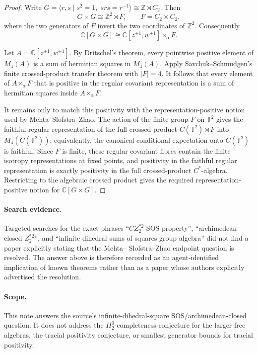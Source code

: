 \documentclass[11pt]{article}
\newcommand{\C}{\mathbb C}
\newcommand{\Z}{\mathbb Z}
\begin{document}
\begin{proof}
Write \(G=\langle r,s\mid s^2=1,\;srs=r^{-1}\rangle\cong \Z\rtimes C_2\).
Then
\[
G\times G\cong \Z^2\rtimes F,\qquad F=C_2\times C_2,
\]
where the two generators of \(F\) invert the two coordinates of \(\Z^2\).
Consequently
\[
\C[G\times G]\cong
\C[z^{\pm1},w^{\pm1}]\rtimes_\alpha F.
\]

Let \(A=\C[z^{\pm1},w^{\pm1}]\). By Dritschel's theorem, every pointwise
positive element of \(M_4(A)\) is a sum of hermitian squares in \(M_4(A)\).
Apply Savchuk--Schmudgen's finite crossed-product transfer theorem with
\(|F|=4\). It follows that every element of \(A\rtimes_\alpha F\) that is
positive in the regular covariant representation is a sum of hermitian squares
inside \(A\rtimes_\alpha F\).

It remains only to match this positivity with the representation-positive
notion used by Mehta--Slofstra--Zhao. The action of the finite group \(F\) on
\(\mathbb T^2\) gives the faithful regular representation of the full crossed
product \(C(\mathbb T^2)\rtimes F\) into \(M_4(C(\mathbb T^2))\); equivalently,
the canonical conditional expectation onto \(C(\mathbb T^2)\) is faithful.
Since \(F\) is finite, these regular covariant fibres contain the finite
isotropy representations at fixed points, and positivity in the faithful
regular representation is exactly positivity in the full crossed-product
\(C^*\)-algebra. Restricting to the algebraic crossed product gives the
required representation-positive notion for \(\C[G\times G]\).
\end{proof}

\paragraph{Search evidence.}
Targeted searches for the exact phrases ``\(C Z_2^{*2}\) SOS property'',
``archimedean closed \(Z_2^{*2}\)'', and ``infinite dihedral sums of squares
group algebra'' did not find a paper explicitly stating that the Mehta--
Slofstra--Zhao endpoint question is resolved. The answer above is therefore
recorded as an agent-identified implication of known theorems rather than as a
paper whose authors explicitly advertised the resolution.

\paragraph{Scope.}
This note answers the source's infinite-dihedral-square SOS/archimedean-closed
question. It does not address the \(\Pi^0_2\)-completeness conjecture for the
larger free algebras, the tracial positivity conjecture, or smallest generator
bounds for tracial positivity.
\end{document}
